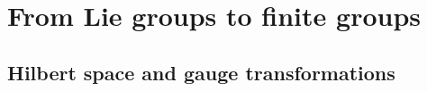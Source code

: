\section{From Lie groups to finite groups}
\label{sec:from_lie_groups_to_finite_groups}



\subsection{Hilbert space and gauge transformations}



